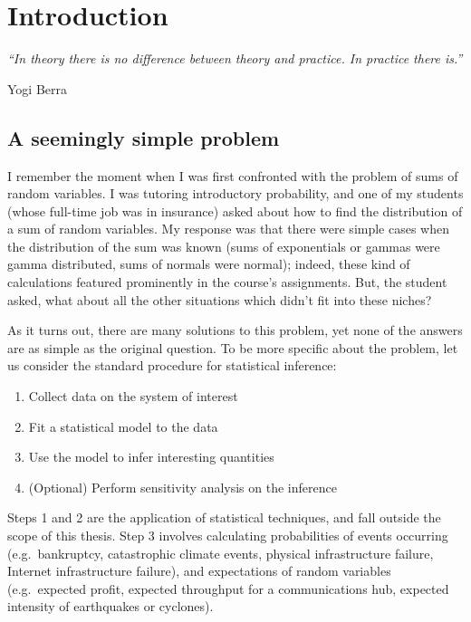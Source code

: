 \chapter{Introduction} \label{chp:intro}

\setcounter{page}{1}

\begin{center}
\emph{``In theory there is no difference between theory and practice. In practice there is.''}
\end{center}
\hfill Yogi Berra~~~~~~~~

\section{A seemingly simple problem}

I remember the moment when I was first confronted with the problem of sums of random variables. I was tutoring introductory probability, and one of my students (whose full-time job was in insurance) asked about how to find the distribution of a sum of random variables. My response was that there were simple cases when the distribution of the sum was known (sums of exponentials or gammas were gamma distributed, sums of normals were normal); indeed, these kind of calculations featured prominently in the course's assignments. But, the student asked, what about all the other situations which didn't fit into these niches?

As it turns out, there are many solutions to this problem, yet none of the answers are as simple as the original question.
To be more specific about the problem, let us consider the standard procedure for statistical inference:
\begin{enumerate}
\item Collect data on the system of interest
\item Fit a statistical model to the data
\item Use the model to infer interesting quantities
\item (Optional) Perform sensitivity analysis on the inference
\end{enumerate}
Steps 1 and 2 are the application of statistical techniques, and fall outside the scope of this thesis. Step 3 involves calculating probabilities of events occurring (e.g.\ bankruptcy, catastrophic climate events, physical infrastructure failure, Internet infrastructure failure), and expectations of random variables (e.g.\ expected profit, expected throughput for a communications hub, expected intensity of earthquakes or cyclones).

